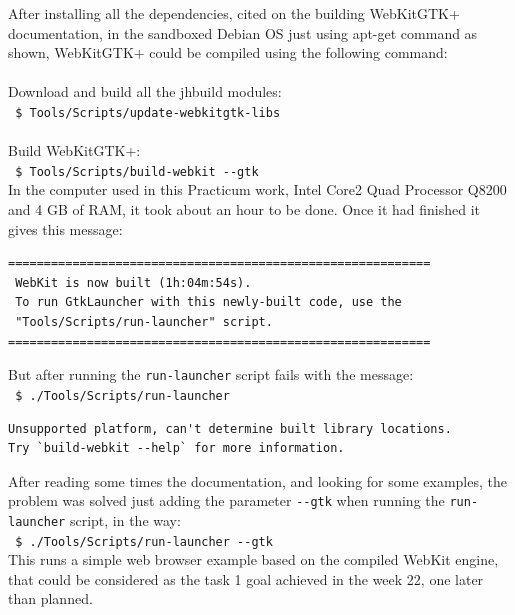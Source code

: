 \documentclass[a4paper,11pt,openany]{report}
\begin{document}
After installing all the dependencies, cited on the building WebKitGTK+ documentation, in the sandboxed Debian OS just using apt-get command as shown, WebKitGTK+ could be compiled using the following command:\\
\\
Download and build all the jhbuild modules:\\
\verb# $ Tools/Scripts/update-webkitgtk-libs #\\
\\
Build WebKitGTK+:\\
\verb# $ Tools/Scripts/build-webkit --gtk #\\

In the computer used in this Practicum work, Intel{\textregistered} Core{\texttrademark}2 Quad Processor Q8200 and 4 GB of RAM, it took about an hour to be done. Once it had finished it gives this message:

{
\footnotesize
\begin{lstlisting}
===========================================================
 WebKit is now built (1h:04m:54s).
 To run GtkLauncher with this newly-built code, use the
 "Tools/Scripts/run-launcher" script.
===========================================================
\end{lstlisting}
}

But after running the \verb#run-launcher# script fails with the message:\\
\verb# $ ./Tools/Scripts/run-launcher #\\

{
\footnotesize
\begin{lstlisting}
Unsupported platform, can't determine built library locations.
Try `build-webkit --help` for more information.
\end{lstlisting}
}

After reading some times the documentation, and looking for some examples, the problem was solved just adding the parameter \verb#--gtk# when running the \verb#run-launcher# script, in the way:\\
\verb# $ ./Tools/Scripts/run-launcher --gtk #\\

This runs a simple web browser example based on the compiled WebKit engine, that could be considered as the task 1 goal achieved in the week 22, one later than planned.
\end{document}
